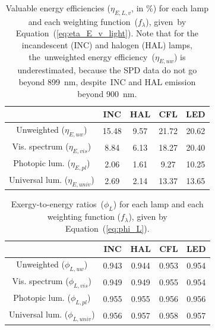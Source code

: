 \documentclass[energies,article,accept,moreauthors,pdftex]{Definitions/mdpi}\usepackage[]{graphicx}\usepackage[]{color}
\begin{document}
\unskip
\begin{table}[H]
\centering
\caption{Valuable energy efficiencies
                     ($\eta_{E,L,v}$, in \%) for each lamp
                     and each weighting function~($f_\lambda$),
                     \mbox{given by} Equation~(\ref{eq:eta_E_v_light}).
                     Note that for the incandescent (INC) and halogen (HAL) lamps, 
                     \mbox{the unweighted} energy efficiency~($\eta_{E,uw}$) is  
                     underestimated, because
                     the SPD data do not go beyond 899~nm, 
                     \mbox{despite INC} and HAL emission beyond 900~nm.} 
\label{tab:results_etas}
\begingroup\footnotesize
\begin{tabular}{ccccc}
  \toprule
 & \textbf{INC} & \textbf{HAL} & \textbf{CFL} & \textbf{LED} \\ 
  \midrule
Unweighted ($\eta_{E,uw}$) & 15.48 & 9.57 & 21.72 & 20.62 \\ 
  Vis. spectrum ($\eta_{E,vis}$) & 8.84 & 6.13 & 18.27 & 20.40 \\ 
  Photopic lum. ($\eta_{E,pl}$) & 2.06 & 1.61 & 9.27 & 10.25 \\ 
  Universal lum. ($\eta_{E,univ}$) & 2.69 & 2.14 & 13.37 & 13.65 \\ 
   \bottomrule
\end{tabular}
\endgroup
\end{table}
\unskip
\begin{table}[H]
\centering
\caption{Exergy-to-energy ratios~($\phi_L$) 
                     for each lamp 
                     and each weighting function ($f_{\lambda}$),
                     given by Equation~(\ref{eq:phi_L}).} 
\label{tab:results_phis}
\begingroup\footnotesize
\begin{tabular}{ccccc}
  \toprule
 & \textbf{INC} & \textbf{HAL} & \textbf{CFL} & \textbf{LED} \\ 
  \midrule
Unweighted ($\phi_{L,uw}$) & 0.943 & 0.944 & 0.953 & 0.954 \\ 
  Vis. spectrum ($\phi_{L,vis}$) & 0.949 & 0.949 & 0.955 & 0.954 \\ 
  Photopic lum. ($\phi_{L,pl}$) & 0.955 & 0.955 & 0.956 & 0.956 \\ 
  Universal lum. ($\phi_{L,univ}$) & 0.956 & 0.957 & 0.958 & 0.957 \\ 
   \bottomrule
\end{tabular}
\endgroup
\end{table}
\unskip
\end{document}
